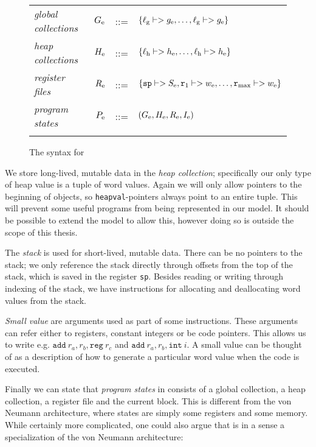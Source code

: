 \begin{figure}
{\begin{tabular}{lrcl}
      \textit{global collections} & $G_{\mathrm{e}}$ & ::= & $\{\ell_{\mathrm{g}} |-> g_{\mathrm{e}}, \dots, \ell_{\mathrm{g}} |-> g_{\mathrm{e}}\}$ \\
      \textit{heap collections}   & $H_{\mathrm{e}}$ & ::= & $\{\ell_{\mathrm{h}} |-> h_{\mathrm{e}}, \dots, \ell_{\mathrm{h}} |-> h_{\mathrm{e}}\}$ \\
      \textit{register files}     & $R_{\mathrm{e}}$ & ::= & $\{\mathtt{sp} |-> S_{\mathrm{e}}, \mathtt{r}_1 |-> w_{\mathrm{e}}, \dots, \mathtt{r}_{\mathrm{max}} |-> w_{\mathrm{e}}\}$ \\
      \textit{program states} & $P_{\mathrm{e}}$ & ::= & $(G_{\mathrm{e}}, H_{\mathrm{e}}, R_{\mathrm{e}}, I_{\mathrm{e}})$ \\\\
    \end{tabular}
  }
  \caption{The syntax for \ATALe}
  \label{fig:esyntax}
\end{figure}

We store long-lived, mutable data in the \emph{heap collection}; specifically
our only type of heap value is a tuple of word values. Again we will only allow
pointers to the beginning of objects, so \texttt{heapval}-pointers always point
to an entire tuple. This will prevent some useful programs from being
represented in our model. It should be possible to extend the model to allow
this, however doing so is outside the scope of this thesis.

The \emph{stack} is used for short-lived, mutable data. There can be no pointers
to the stack; we only reference the stack directly through offsets from the top
of the stack, which is saved in the register \texttt{sp}. Besides reading or
writing through indexing of the stack, we have instructions for allocating and
deallocating word values from the stack.

\emph{Small value} are arguments used as part of some instructions. These
arguments can refer either to registers, constant integers or be code
pointers. This allows us to write e.g.
$\mathtt{add}\ r_a, r_b, \mathtt{reg}\ r_c$ and
$\mathtt{add}\ r_a, r_b, \mathtt{int}\ i$. A small value can be thought of as a
description of how to generate a particular word value when the code is
executed.

Finally we can state that \emph{program states} in \ATALe consists of a global
collection, a heap collection, a register file and the current block. This is
different from the von Neumann architecture, where states are simply some
registers and some memory. While certainly more complicated, one could also
argue that \ATALe is in a sense a specialization of the von Neumann
architecture:


